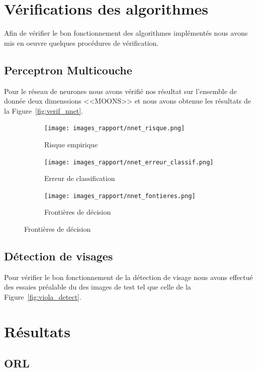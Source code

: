 \documentclass[a4paper,10pt,twocolumn]{extarticle}
\begin{document}
\section{Vérifications des algorithmes}
Afin de vérifier le bon fonctionnement des algorithmes implémentés nous avons mis en oeuvre quelques procédures de vérification.

\subsection{Perceptron Multicouche}
Pour le réseau de neurones nous avons vérifié nos résultat sur l'ensemble de donnée deux dimenssions <<MOONS>> et nous avons obtenue les résultats de la Figure~\ref{fig:verif_nnet}.
\begin{figure}[H]
        \centering
        \caption{Vérification du réseau de neurones}\label{fig:verif_nnet}
        \begin{subfigure}[b]{220pt}
                \centering
                \caption{Risque empirique}
                \texttt{[image: images\_rapport/nnet\_risque.png]}
        \end{subfigure}
        \begin{subfigure}[b]{220pt}
                \centering
                \caption{Erreur de classification}
                \texttt{[image: images\_rapport/nnet\_erreur\_classif.png]}
        \end{subfigure}
        \begin{subfigure}[b]{220pt}
                \centering
                \caption{Frontières de décision}
                \texttt{[image: images\_rapport/nnet\_fontieres.png]}
        \end{subfigure}
\end{figure}

\subsection{Détection de visages}
Pour vérifier le bon fonctionnement de la détection de visage nous avons effectué des essaies préalable du des images de test tel que celle de la Figure~\ref{fig:viola_detect}.

\section{Résultats}
\subsection{ORL}
\end{document}

